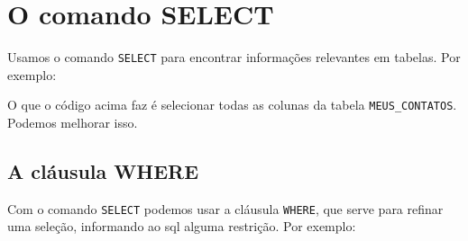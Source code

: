 \chapter{O comando SELECT}
\label{chap:comando_select}

Usamos o comando \verb|SELECT| para encontrar informações relevantes em tabelas. Por exemplo:


O que o código acima faz é selecionar todas as colunas da tabela \verb|MEUS_CONTATOS|. Podemos melhorar isso.

\section{A cláusula WHERE}
\label{sec:clausula_where}

Com o comando \verb|SELECT| podemos usar a cláusula \verb|WHERE|, que serve para refinar uma seleção, informando ao sql alguma restrição. Por exemplo:

